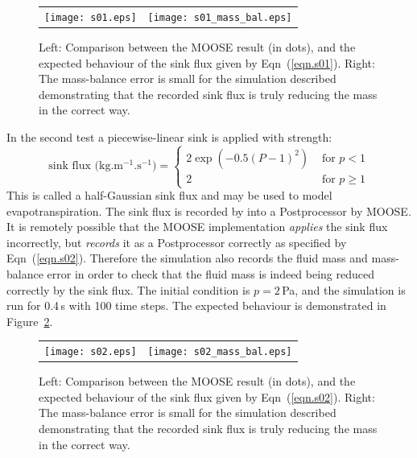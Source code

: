 \documentclass[]{scrreprt}
\begin{document}
\begin{figure}[htb]
\centering
\begin{tabular}{cc}
\texttt{[image: s01.eps]} &
\texttt{[image: s01\_mass\_bal.eps]}
\end{tabular}
\caption{Left: Comparison between the MOOSE result (in dots), and the
  expected behaviour of the sink flux given by Eqn~(\ref{eqn.s01}).
  Right: The mass-balance error is small for the simulation described
  demonstrating that the recorded sink flux is truly reducing the mass
  in the correct way.}
\label{s01.fig}
\end{figure}


\noindent In the second test a piecewise-linear sink is applied with strength:
\begin{equation}
\mbox{sink flux (kg.m$^{-1}$.s$^{-1}$)} = \left\{
\begin{array}{ll}
2\exp(-0.5(P-1)^{2}) & \mbox{ for } p < 1 \\
2 & \mbox{ for } p\geq 1 
\end{array}
\right.
\label{eqn.s02}
\end{equation}
This is called a half-Gaussian sink flux and may be used to model
evapotranspiration.  The sink flux is recorded by into a Postprocessor by MOOSE.  It is
remotely possible that the MOOSE implementation {\em applies} the sink
flux incorrectly, but {\em records} it as a Postprocessor correctly as
specified by Eqn~(\ref{eqn.s02}).  Therefore the simulation also
records the fluid mass and mass-balance error in order to check that
the fluid mass is indeed being reduced correctly by the sink flux.
The initial condition is $p=2$\,Pa, and the simulation is run for
0.4\,s with 100 time steps.  The expected behaviour is demonstrated in
Figure~\ref{s02.fig}.

\begin{figure}[htb]
\centering
\begin{tabular}{cc}
\texttt{[image: s02.eps]} &
\texttt{[image: s02\_mass\_bal.eps]}
\end{tabular}
\caption{Left: Comparison between the MOOSE result (in dots), and the
  expected behaviour of the sink flux given by Eqn~(\ref{eqn.s02}).
  Right: The mass-balance error is small for the simulation described
  demonstrating that the recorded sink flux is truly reducing the mass
  in the correct way.}
\label{s02.fig}
\end{figure}
\end{document}
